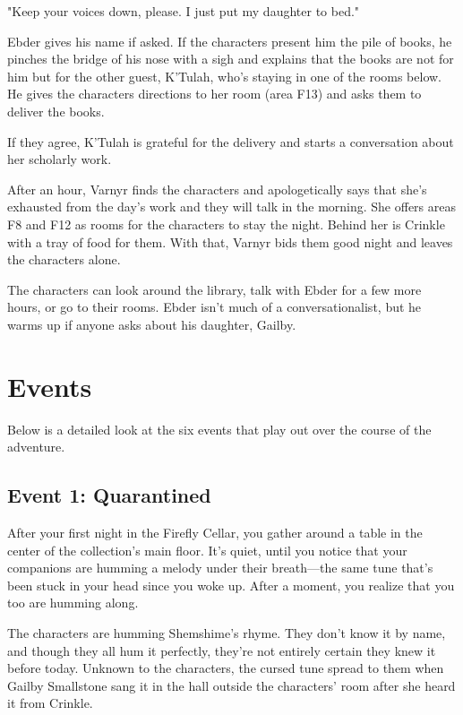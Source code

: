 \documentclass[10pt,a4paper,twoside,bg=print,twocolumn,openany,nodeprecatedcode]{dndbook}
\begin{document}
\begin{DndReadAloud}{}
"Keep your voices down, please. I just put my daughter to bed."

\end{DndReadAloud}

Ebder gives his name if asked. If the characters present him the pile of books, he pinches the bridge of his nose with a sigh and explains that the books are not for him but for the other guest, K'Tulah, who's staying in one of the rooms below. He gives the characters directions to her room (area F13) and asks them to deliver the books.

If they agree, K'Tulah is grateful for the delivery and starts a conversation about her scholarly work.

After an hour, Varnyr finds the characters and apologetically says that she's exhausted from the day's work and they will talk in the morning. She offers areas F8 and F12 as rooms for the characters to stay the night. Behind her is Crinkle with a tray of food for them. With that, Varnyr bids them good night and leaves the characters alone.

The characters can look around the library, talk with Ebder for a few more hours, or go to their rooms. Ebder isn't much of a conversationalist, but he warms up if anyone asks about his daughter, Gailby.

\section{Events}
Below is a detailed look at the six events that play out over the course of the adventure.

\subsection{Event 1: Quarantined}
\begin{DndReadAloud}{}
After your first night in the Firefly Cellar, you gather around a table in the center of the collection's main floor. It's quiet, until you notice that your companions are humming a melody under their breath—the same tune that's been stuck in your head since you woke up. After a moment, you realize that you too are humming along.

\end{DndReadAloud}

The characters are humming Shemshime's rhyme. They don't know it by name, and though they all hum it perfectly, they're not entirely certain they knew it before today. Unknown to the characters, the cursed tune spread to them when Gailby Smallstone sang it in the hall outside the characters' room after she heard it from Crinkle.
\end{document}
